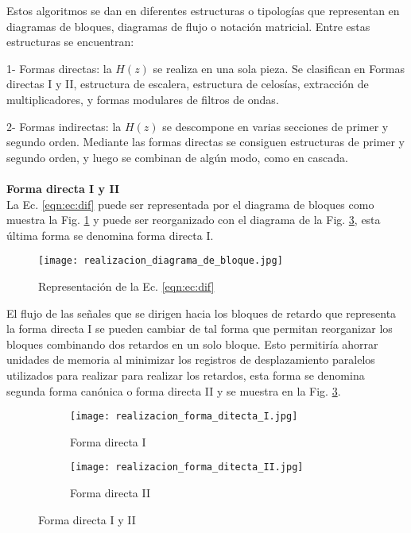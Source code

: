 \documentclass[informe.tex]{subfiles}
\begin{document}
Estos algoritmos se dan en diferentes estructuras o tipologías que representan en diagramas de bloques, diagramas de flujo o notación matricial. Entre estas estructuras se encuentran:\newline

1- Formas directas: la $H(z)$ se realiza en una sola pieza. Se clasifican en Formas directas I y II, estructura de escalera, estructura de celosías, extracción de multiplicadores, y formas modulares de filtros de ondas.\newline

2- Formas indirectas: la $H(z)$ se descompone en varias secciones de primer y segundo orden.  Mediante las formas directas se consiguen estructuras de primer y segundo orden, y luego se combinan de algún modo, como en cascada.\\\\

\textbf{Forma directa I y II}\\

La Ec. \ref{eqn:ec:dif} puede ser representada por el diagrama de bloques como muestra la Fig. \ref{fig:realizacion:diagrama} y puede ser reorganizado con el diagrama de la Fig. \ref{fig:realizacion:forma_directa_I}, esta última forma se denomina forma directa I. 

	\begin{figure}[h]
		\centering
		\texttt{[image: realizacion\_diagrama\_de\_bloque.jpg]}	
		\caption{Representación de la Ec. \ref{eqn:ec:dif} }
		\label{fig:realizacion:diagrama}
	\end{figure}	

El flujo de las señales que se dirigen hacia los bloques de retardo que representa la forma directa I se pueden cambiar de tal forma que permitan reorganizar los bloques combinando dos retardos en un solo bloque. Esto permitiría ahorrar unidades de memoria al minimizar los registros de desplazamiento paralelos utilizados para realizar para realizar los retardos, esta forma se denomina segunda forma canónica o forma directa II y se muestra en la Fig. \ref{fig:realizacion:forma_directa_I}.

\begin{figure}[h]
	\centering
	\begin{subfigure}[b]{0.4\textwidth}
	\centering
		\texttt{[image: realizacion\_forma\_ditecta\_I.jpg]}
		\caption{Forma directa I}
		\label{fig:realizacion:forma_directa_I}
	\end{subfigure}
	\bigskip
	\begin{subfigure}[b]{0.4\textwidth}
		\centering
		\texttt{[image: realizacion\_forma\_ditecta\_II.jpg]}
		\caption{Forma directa II}
		\label{fig:realizacion:forma_directa_I}
	\end{subfigure}  
	\caption{Forma directa I y II}
	\label{fig:realizacion:forma_directa}
\end{figure}
\end{document}
